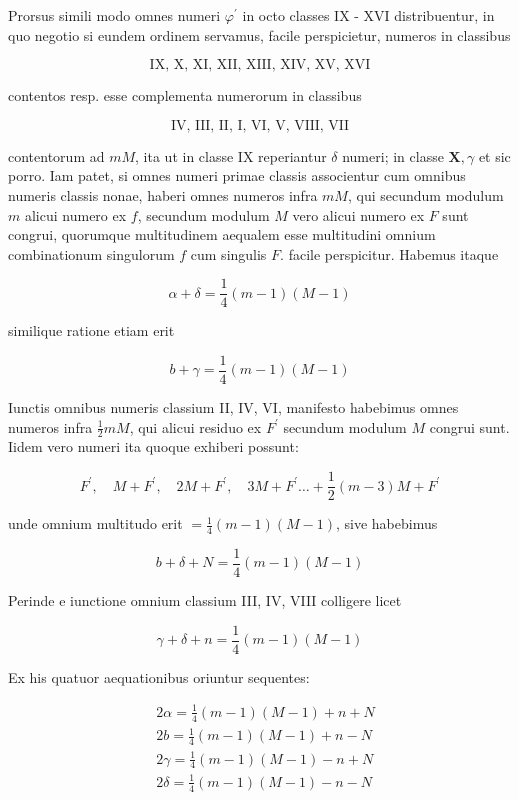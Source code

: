 \documentclass[10pt]{article}
\begin{document}
Prorsus simili modo omnes numeri \(\varphi^{\prime}\) in octo classes IX - XVI distribuentur, in quo negotio si eundem ordinem servamus, facile perspicietur, numeros in classibus

\[
\text { IX, X, XI, XII, XIII, XIV, XV, XVI }
\]

contentos resp. esse complementa numerorum in classibus

\[
\text { IV, III, II, I, VI, V, VIII, VII }
\]

contentorum ad \(m M\), ita ut in classe IX reperiantur \(\delta\) numeri; in classe \(\mathbf{X}, \gamma\) et sic porro. Iam patet, si omnes numeri primae classis associentur cum omnibus numeris classis nonae, haberi omnes numeros infra \(m M\), qui secundum modulum \(m\) alicui numero ex \(f\), secundum modulum \(M\) vero alicui numero ex \(F\) sunt congrui, quorumque multitudinem aequalem esse multitudini omnium combinationum singulorum \(f\) cum singulis \(F\). facile perspicitur. Habemus itaque

\[
\alpha+\delta=\frac{1}{4}(m-1)(M-1)
\]

similique ratione etiam erit

\[
b+\gamma=\frac{1}{4}(m-1)(M-1)
\]

Iunctis omnibus numeris classium II, IV, VI, manifesto habebimus omnes numeros infra \(\frac{1}{2} m M\), qui alicui residuo ex \(F^{\prime}\) secundum modulum \(M\) congrui sunt. Iidem vero numeri ita quoque exhiberi possunt:

\[
F^{\prime}, \quad M+F^{\prime}, \quad 2 M+F^{\prime}, \quad 3 M+F^{\prime} \ldots+\frac{1}{2}(m-3) M+F^{\prime}
\]

unde omnium multitudo erit \(=\frac{1}{4}(m-1)(M-1)\), sive habebimus

\[
b+\delta+N=\frac{1}{4}(m-1)(M-1)
\]

Perinde e iunctione omnium classium III, IV, VIII colligere licet

\[
\gamma+\delta+n=\frac{1}{4}(m-1)(M-1)
\]

Ex his quatuor aequationibus oriuntur sequentes:

\[
\begin{aligned}
& 2 \alpha=\frac{1}{4}(m-1)(M-1)+n+N \\
& 2 b=\frac{1}{4}(m-1)(M-1)+n-N \\
& 2 \gamma=\frac{1}{4}(m-1)(M-1)-n+N \\
& 2 \delta=\frac{1}{4}(m-1)(M-1)-n-N
\end{aligned}
\]
\end{document}
